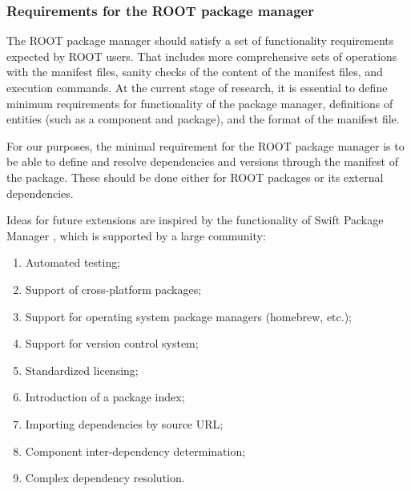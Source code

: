 \documentclass{webofc}
\begin{document}

\subsubsection{Requirements for the ROOT package manager}

The ROOT package manager should satisfy a set of functionality requirements expected by ROOT users. That includes more comprehensive sets of operations with the manifest files, sanity checks of the content of the manifest files, and execution commands. At the current stage of research, it is essential to define minimum requirements for functionality of the package manager, definitions of entities (such as  a component and package), and the format of the manifest file. 

For our purposes, the minimal requirement for the ROOT package manager is to be able to define and resolve dependencies and versions through the manifest of the package. These should be done either for ROOT packages or its external dependencies. 

Ideas for future extensions are inspired by the functionality of Swift Package Manager \cite{swiftpm}, which is supported by a large  community:
\begin{enumerate}
\item Automated testing; 
\item Support of cross-platform packages;
\item Support for operating system package managers (homebrew, etc.);
\item Support for version control system;
\item Standardized licensing;
\item Introduction of a package index;
\item Importing dependencies by source URL;
\item Component inter-dependency determination;
\item Complex dependency resolution.
\end{enumerate}
\end{document}
